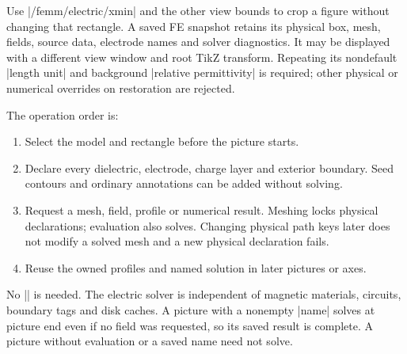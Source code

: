 Use |/femm/electric/xmin| and the other view bounds to crop a figure without
changing that rectangle. A saved FE snapshot retains its physical box, mesh,
fields, source data, electrode names and solver diagnostics. It may be displayed
with a different view window and root TikZ transform. Repeating its nondefault
|length unit| and background |relative permittivity| is required; other physical
or numerical overrides on restoration are rejected.

The operation order is:
\begin{enumerate}
\item Select the model and rectangle before the picture starts.
\item Declare every dielectric, electrode, charge layer and exterior boundary.
      Seed contours and ordinary annotations can be added without solving.
\item Request a mesh, field, profile or numerical result. Meshing locks physical
      declarations; evaluation also solves. Changing physical path keys later
      does not modify a solved mesh and a new physical declaration fails.
\item Reuse the owned profiles and named solution in later pictures or axes.
\end{enumerate}
No |\femmsolve| is needed. The electric solver is independent of magnetic
materials, circuits, boundary tags and disk caches. A picture with a nonempty
|name| solves at picture end even if no field was requested, so its saved result
is complete. A picture without evaluation or a saved name need not solve.

